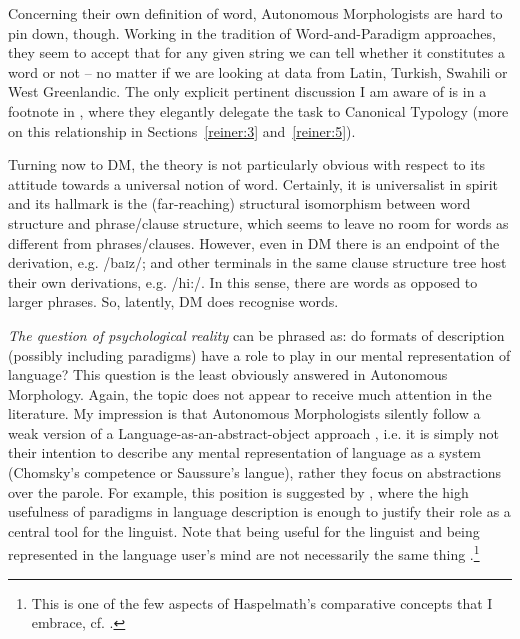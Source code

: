 \documentclass[output=paper]{langsci/langscibook}
\begin{document}
\begin{sloppypar}
Concerning their own definition of word, Autonomous Morphologists are hard to pin down, though. Working in the tradition of Word-and-Paradigm approaches, they seem to accept that for any given string we can tell whether it constitutes a word or not – no matter if we are looking at data from Latin, Turkish, Swahili or West Greenlandic. The only explicit pertinent discussion I am aware of is in a footnote in \citet[127–128]{SpencerLuis2013}, where they elegantly delegate the task to Canonical Typology (more on this relationship in Sections~\ref{reiner:3} and~\ref{reiner:5}).
\end{sloppypar}

Turning now to DM, the theory is not particularly obvious with respect to its attitude towards a universal notion of word. Certainly, it is universalist in spirit and its hallmark is the (far-reaching) structural isomorphism between word structure and phrase/clause structure, which seems to leave no room for words as different from phrases/clauses. However, even in DM there is an endpoint of the derivation, e.g. /ba\textsc{i}z/; and other terminals in the same clause structure tree host their own derivations, e.g. /hi:/. In this sense, there are words as opposed to larger phrases. So, latently, DM does recognise words.

\textit{The question of psychological reality} can be phrased as: do formats of description (possibly including paradigms) have a role to play in our mental representation of language? This question is the least obviously answered in Autonomous Morphology. Again, the topic does not appear to receive much attention in the literature. My impression is that Autonomous Morphologists silently follow a weak version of a Language-as-an-abstract-object approach \citep{Katz1981}, i.e. it is simply not their intention to describe any mental representation of language as a system (Chomsky’s competence or Saussure’s langue), rather they focus on abstractions over the parole. For example, this position is suggested by \citet[197--198]{Aronoff2016}, where the high usefulness of paradigms in language description is enough to justify their role as a central tool for the linguist. Note that being useful for the linguist and being represented in the language user’s mind are not necessarily the same thing \citep[92, fn. 7]{Haspelmath2018}.\footnote{This is one of the few aspects of Haspelmath’s comparative concepts that I embrace, cf. \citet{ReinerInPress}.}
\end{document}
